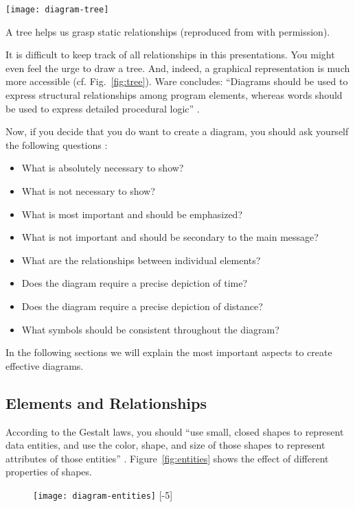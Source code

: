 \begin{marginfigure}
\centering
\texttt{[image: diagram-tree]}
\caption{\label{fig:tree} A tree helps us grasp static relationships (reproduced from \cite{Ware12} with permission).}%
\end{marginfigure}

It is difficult to keep track of all relationships in this presentations. You might even feel the urge to draw a tree. And, indeed, a graphical representation is much more accessible (cf. Fig.~\ref{fig:tree}). Ware concludes: ``Diagrams should be used to express structural relationships among program elements, whereas words should be used to express detailed procedural logic'' \cite{Ware12}.


Now, if you decide that you do want to create a diagram, you should ask yourself the following questions \cite{Carter12}:
\begin{itemize}
\item What is absolutely necessary to show?
\item What is not necessary to show?
\item What is most important and should be emphasized?
\item What is not important and should be secondary to the main message?
\item What are the relationships between individual elements?
\item Does the diagram require a precise depiction of time?
\item Does the diagram require a precise depiction of distance?
\item What symbols should be consistent throughout the diagram?
\end{itemize}

In the following sections we will explain the most important aspects to create effective diagrams.

\subsection{Elements and Relationships}

According to the Gestalt laws, you should
``use small, closed shapes to represent data entities, and use the color, shape, and size of those shapes to represent attributes of those entities'' \cite{Ware12}. Figure~\ref{fig:entities} shows the effect of different properties of shapes.

\begin{figure}[t]
\centering
\texttt{[image: diagram-entities]}
[-5\baselineskip]
\end{figure}

